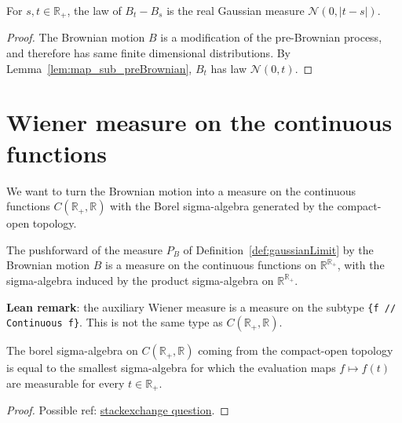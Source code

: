 \begin{lemma}\label{lem:measurePreserving_brownian_sub}
  \leanok
For $s, t \in \mathbb{R}_+$, the law of $B_t - B_s$ is the real Gaussian measure $\mathcal{N}(0,\vert t - s \vert)$.
\end{lemma}

\begin{proof}\leanok
The Brownian motion $B$ is a modification of the pre-Brownian process, and therefore has same finite dimensional distributions. By Lemma~\ref{lem:map_sub_preBrownian}, $B_t$ has law $\mathcal{N}(0,t)$.
\end{proof}

\section{Wiener measure on the continuous functions}

We want to turn the Brownian motion into a measure on the continuous functions $C(\mathbb{R}_+, \mathbb{R})$ with the Borel sigma-algebra generated by the compact-open topology.


\begin{definition}\label{def:wienerMeasureAux}
  \leanok
The pushforward of the measure $P_B$ of Definition~\ref{def:gaussianLimit} by the Brownian motion $B$ is a measure on the continuous functions on $\mathbb{R}^{\mathbb{R}_+}$, with the sigma-algebra induced by the product sigma-algebra on $\mathbb{R}^{\mathbb{R}_+}$.
\end{definition}

\textbf{Lean remark}: the auxiliary Wiener measure is a measure on the subtype \texttt{\{f  // Continuous f\}}. This is not the same type as $C(\mathbb{R}_+, \mathbb{R})$.


\begin{theorem}\label{thm:ContinuousMap.borel_eq_iSup_comap_eval}
  \leanok
The borel sigma-algebra on $C(\mathbb{R}_+, \mathbb{R})$ coming from the compact-open topology is equal to the smallest sigma-algebra for which the evaluation maps $f \mapsto f(t)$ are measurable for every $t \in \mathbb{R}_+$.
\end{theorem}

\begin{proof}
Possible ref: \href{https://math.stackexchange.com/questions/4789531/when-does-the-borel-sigma-algebra-of-compact-convergence-coincide-with-the-pr}{stackexchange question}.
\end{proof}


